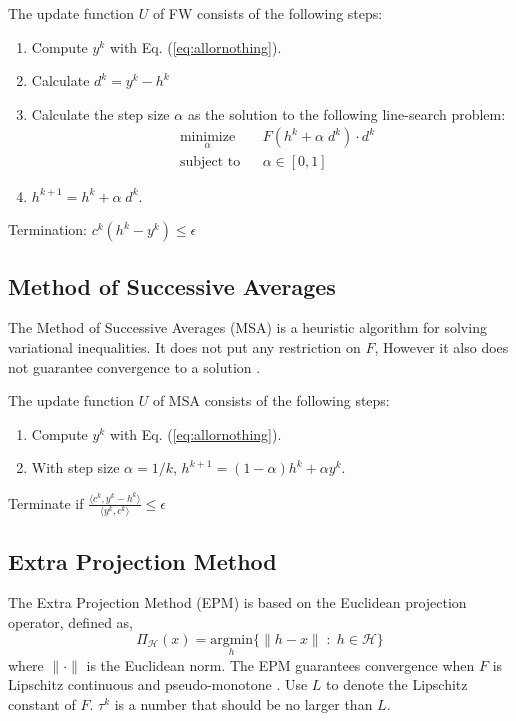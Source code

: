 {The update function $U$ of FW consists of the following steps:
\begin{enumerate}
\item Compute $y^k$ with Eq. (\ref{eq:allornothing}).
\item Calculate $d^k = y^k - h^k$
\item Calculate the step size $\alpha$ as the solution to the following line-search problem:
\begin{equation}
\begin{aligned}
& \underset{\alpha}{\text{minimize}}
& & F(h^k + \alpha\; d^k)\cdot d^k \\
& \text{subject to}
& & \alpha \in [0,1]
\end{aligned}
\end{equation}
\item $h^{k+1} = h^k +\alpha\; d^k$.
\end{enumerate}

Termination: $c^k(h^k-y^k) \leq \epsilon$

\subsection{Method of Successive Averages}
The Method of Successive Averages (MSA) is a heuristic algorithm for solving variational inequalities. It does not put any restriction on $F$, However it also does not guarantee convergence to a solution  \cite{nie2010solving}.

The update function $U$ of MSA consists of the following steps:
\begin{enumerate}
\item Compute $y^k$ with Eq. (\ref{eq:allornothing}).
\item With step size $\alpha = 1/k$,  $h^{k+1} = (1-\alpha)h^k + \alpha y^k$. 
\end{enumerate}

Terminate if ${\frac {\langle c^k,y^k-h^k \rangle} {\langle y^k, c^k\rangle}} \leq \epsilon$

\subsection{Extra Projection Method}
The Extra Projection Method (EPM) is based on the Euclidean projection operator, defined as,
\begin{equation}
\Pi_\mathcal{H}(x) = \underset{h}{\text{argmin}}\{\lVert h-x\rVert \; : \;h \in\mathcal{H} \}
\end{equation}
where $\lVert\cdot\rVert$ is the Euclidean norm. The EPM guarantees convergence when $F$ is Lipschitz continuous and pseudo-monotone \cite{nie2010solving}. Use $L$ to denote the Lipschitz constant of $F$. $\tau^k$ is a number that should be no larger than $L$.

}
